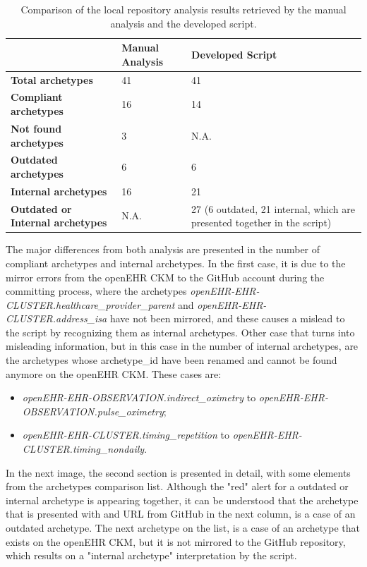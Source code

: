 \documentclass[mim_thesis.tex]{subfiles}
\begin{document}
\begin{table}[H]
\centering
\caption{Comparison of the local repository analysis results retrieved by the manual analysis and the developed script. }
\label{tab:comp_manual_script}
\begin{tabular}{p{6cm} p{3cm} p{6.5cm}}
\toprule[2pt]
\textbf{ } & \textbf{Manual Analysis} & \textbf{Developed Script} \\ \midrule[2pt]
\textbf{Total archetypes}  & 41 & 41 \\ \midrule
\textbf{Compliant archetypes} & 16 & 14 \\ \midrule
\textbf{Not found archetypes} & 3 & N.A. \\ \midrule
\textbf{Outdated archetypes} & 6 & 6 \\ \midrule
\textbf{Internal archetypes} & 16 & 21 \\ \midrule
\textbf{Outdated or Internal archetypes} & N.A. & 27 (6 outdated, 21 internal, which are presented together in the script)
\\ \bottomrule[2pt]
\end{tabular}
\end{table}

The major differences from both analysis are presented in the number of compliant archetypes and internal archetypes. In the first case, it is due to the mirror errors from the openEHR CKM to the GitHub account during the committing process, where the archetypes \textit{openEHR-EHR-CLUSTER.healthcare\_provider\_parent} and \textit{openEHR-EHR-CLUSTER.address\_isa} have not been mirrored, and these causes a mislead to the script by recognizing them as internal archetypes. Other case that turns into misleading information, but in this case in the number of internal archetypes, are the archetypes whose archetype\_id have been renamed and cannot be found anymore on the openEHR CKM. These cases are:

\begin{itemize}[noitemsep]
\item \textit{openEHR-EHR-OBSERVATION.indirect\_oximetry} to \textit{openEHR-EHR-OBSERVATION.pulse\_oximetry};
\item \textit{openEHR-EHR-CLUSTER.timing\_repetition} to \textit{openEHR-EHR-CLUSTER.timing\_nondaily}.
\end{itemize}

In the next image, the second section is presented in detail, with some elements from the archetypes comparison list. Although the "red" alert for a outdated or internal archetype is appearing together, it can be understood that the archetype that is presented with and URL from GitHub in the next column, is a case of an outdated archetype. The next archetype on the list, is a case of an archetype that exists on the openEHR CKM, but it is not mirrored to the GitHub repository, which results on a "internal archetype" interpretation by the script.
\end{document}
